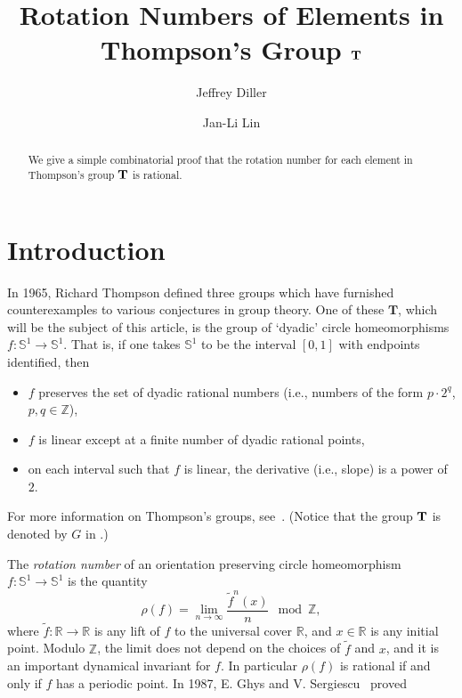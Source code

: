 \documentclass[11pt]{amsart}
\title{Rotation Numbers of Elements in Thompson's Group ${\bf T}$}
\author{Jeffrey Diller}
\author{Jan-Li Lin}
\theoremstyle{definition}
\theoremstyle{plain}
\theoremstyle{remark}
\numberwithin{equation}{section}
\def\R{\mathbb{R}}
\def\Z{\mathbb{Z}}
\def\S{\mathbb{S}}
\def\TT{\mathbf{T}}
\begin{document}
\begin{abstract}
We give a simple combinatorial proof that the rotation number for each element in Thompson's group ${\bf T}$
is rational.
\end{abstract}


\maketitle

\section{Introduction}
\label{introduction}

In 1965, Richard Thompson defined three groups which have furnished counterexamples to various conjectures in group theory.  One of these $\TT$, which will be the subject of this article, is the group of `dyadic' circle homeomorphisms $f:\S^1\to \S^1$.  That is, if one takes $\S^1$ to be the interval $[0,1]$ with endpoints identified, then
\begin{itemize}
\item $f$ preserves the set of dyadic rational numbers (i.e., numbers of the form $p\cdot2^q$, $p,q\in\Z$),
\item $f$ is linear except at a finite number of dyadic rational points,
\item on each interval such that $f$ is linear, the derivative (i.e., slope) is a power of $2$.
\end{itemize}
For more information on Thompson's groups, see~\cites{CFP, Ghys, GS}. (Notice that the group ${\bf T}$ is denoted by $G$ in \cites{Ghys, GS}.)

The \emph{rotation number} \cite{KH} of an orientation preserving circle homeomorphism $f:\S^1\to \S^1$ is the quantity
\[
\rho(f)=\lim_{n\to\infty}\frac{\widetilde{f}^n(x)}{n} \mod \Z,
\]
where $\widetilde{f}:\R\to\R$ is any lift of $f$ to the universal cover $\R$, and $x\in\R$ is any initial point.  Modulo $\Z$, the limit does not
depend on the choices of $\widetilde{f}$ and $x$, and it is an important dynamical invariant for $f$.  In particular $\rho(f)$ is rational if and only if $f$ has a periodic point.   In 1987, E. Ghys and V. Sergiescu~\cite{GS} proved
\end{document}
